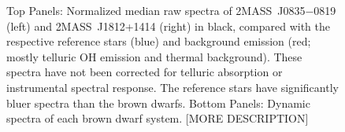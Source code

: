 \documentclass[twocolumn]{aastex6}
\newcommand{\sha}{2MASS~J0835$-$0819}
\newcommand{\shb}{2MASS~J1812+1414}
\begin{document}
\begin{figure}[!t]
\centering
{}
	\caption{Top Panels: Normalized median raw spectra of {\sha} (left) and {\shb} (right) in black, compared with the respective reference stars (blue) and background emission (red; mostly telluric OH emission and thermal background). These spectra have not been corrected for telluric absorption or instrumental spectral response. The reference stars have significantly bluer spectra than the brown dwarfs. Bottom Panels: Dynamic spectra of each brown dwarf system. [MORE DESCRIPTION]}
	\label{fig:specphot}
	\vspace{0.1in}
\end{figure} 
\end{document}
